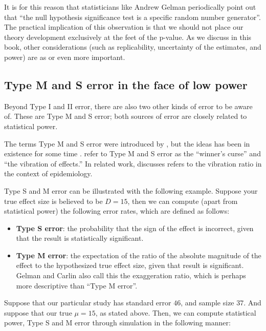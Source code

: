 \documentclass[12pt,]{krantz}
\providecommand{\tightlist}{%
  \setlength{\itemsep}{0pt}\setlength{\parskip}{0pt}}
\begin{document}
It is for this reason that statisticians like Andrew Gelman periodically point out that ``the null hypothesis significance test is a specific random number generator''. The practical implication of this observation is that we should not place our theory development exclusively at the feet of the p-value. As we discuss in this book, other considerations (such as replicability, uncertainty of the estimates, and power) are as or even more important.

\hypertarget{type-m-and-s-error-in-the-face-of-low-power}{%
\subsection{Type M and S error in the face of low power}\label{type-m-and-s-error-in-the-face-of-low-power}}

Beyond Type I and II error, there are also two other kinds of error to be aware of. These are Type M and S error; both sources of error are closely related to statistical power.

The terms Type M and S error were introduced by \citet{Gelman14}, but the ideas has been in existence for some time \citep[\citet{lane1978estimating}]{hedges1984estimation}. \citet{powerfailure} refer to Type M and S error as the ``winner's curse'' and ``the vibration of effects.'' In related work, \citet{ioannidis2008most} discusses refers to the vibration ratio in the context of epidemiology.

Type S and M error can be illustrated with the following example.
Suppose your true effect size is believed to be \(D=15\),
then we can compute (apart from statistical power) the following error rates, which are defined as follows:

\begin{itemize}
\tightlist
\item
  \textbf{Type S error}: the probability that the sign of the effect is incorrect, given that the result is statistically significant.
\item
  \textbf{Type M error}: the expectation of the ratio of the absolute magnitude of the effect to the hypothesized true effect size, given that result is significant.
  Gelman and Carlin also call this the exaggeration ratio, which is perhaps more descriptive than ``Type M error''.
\end{itemize}

Suppose that our particular study has standard error \(46\), and sample size \(37\). And suppose that our true \(\mu=15\), as stated above. Then, we can compute statistical power, Type S and M error through simulation in the following manner:
\end{document}

